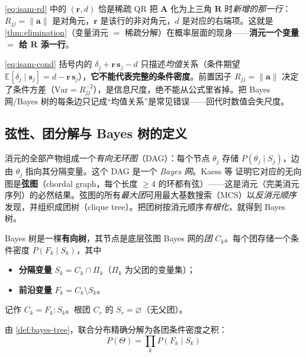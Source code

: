 \noindent\cref{eq:isam-rd} 中的 $(\mathbf{r},d)$ 恰是稀疏 QR 把 $\mathbf{A}$ 化为上三角 $\mathbf{R}$ 时\emph{新增的那一行}：$R_{jj}=\|\mathbf{a}\|$ 是对角元，$\mathbf{r}$ 是该行的非对角元，$d$ 是对应的右端项。这就是 \cref{thm:elimination}（变量消元 $=$ 稀疏分解）在概率层面的现身——\textbf{消元一个变量 $=$ 给 $\mathbf{R}$ 添一行}。

\begin{pitfall}
\cref{eq:isam-cond} 括号内的 $\delta_j+\mathbf{r}\,\mathbf{s}_j-d$ 只描述\emph{均值}关系（条件期望 $\mathbb{E}[\delta_j\mid\mathbf{s}_j]=d-\mathbf{r}\,\mathbf{s}_j$），\textbf{它不能代表完整的条件密度}。前置因子 $R_{jj}=\|\mathbf{a}\|$ 决定了条件方差（$\mathrm{Var}=R_{jj}^{-2}$），是信息尺度，绝不能从公式里省掉。把 Bayes 网/Bayes 树的每条边只记成“均值关系”是常见错误——回代时数值会失尺度。
\end{pitfall}

\subsection{弦性、团分解与 Bayes 树的定义}
\label{sec:isam-chordal}

消元的全部产物组成一个\emph{有向无环图}（DAG）：每个节点 $\theta_j$ 存储 $P(\theta_j\mid S_j)$，边由 $\theta_j$ 指向其分隔变量。这个 DAG 是一个 \emph{Bayes 网}。Kaess 等\cite{kaess2012isam2} 证明它对应的无向图是\textbf{弦图}（chordal graph，每个长度 $\ge 4$ 的环都有弦）——这是消元（完美消元序列）的必然结果。弦图的所有\emph{最大团}可用最大基数搜索（MCS\cite{tarjan1984simple}）以\emph{反消元顺序}发现，并组织成团树（clique tree）。把团树按消元顺序\emph{有根化}，就得到 Bayes 树。

\begin{definition}
\label{def:bayes-tree}
Bayes 树是一棵\textbf{有向树}，其节点是底层弦图 Bayes 网的\emph{团} $C_k$。每个团存储一个条件密度 $P(F_k\mid S_k)$，其中
\begin{itemize}
  \item \textbf{分隔变量} $S_k=C_k\cap\Pi_k$（$\Pi_k$ 为父团的变量集）；
  \item \textbf{前沿变量} $F_k=C_k\setminus S_k$。
\end{itemize}
记作 $C_k=F_k:S_k$。根团 $C_r$ 的 $S_r=\varnothing$（无父团）。
\end{definition}

由 \cref{def:bayes-tree}，联合分布精确分解为各团条件密度之积\cite{kaess2012isam2}：
\begin{equation}
  \boxed{\;P(\Theta)=\prod_k P(F_k\mid S_k)\;}
  \label{eq:bayes-tree-factor}
\end{equation}

